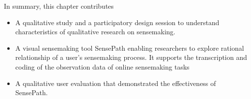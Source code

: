 
In summary, this chapter contributes
\begin{itemize}
\item A qualitative study and a participatory design session to understand characteristics of qualitative research on sensemaking.
\item A visual sensemaking tool SensePath enabling researchers to explore rational relationship of a user's sensemaking process. It supports the transcription and coding of the observation data of online sensemaking tasks
\item A qualitative user evaluation that demonstrated the effectiveness of SensePath.
\end{itemize}